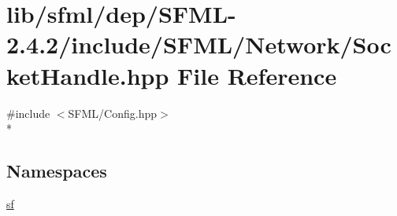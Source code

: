 \hypertarget{sfml_2dep_2_s_f_m_l-2_84_82_2include_2_s_f_m_l_2_network_2_socket_handle_8hpp}{\section{lib/sfml/dep/\-S\-F\-M\-L-\/2.4.2/include/\-S\-F\-M\-L/\-Network/\-Socket\-Handle.hpp File Reference}
\label{sfml_2dep_2_s_f_m_l-2_84_82_2include_2_s_f_m_l_2_network_2_socket_handle_8hpp}
}
{\ttfamily \#include $<$S\-F\-M\-L/\-Config.\-hpp$>$}\\*
\subsection*{Namespaces}
\begin{DoxyCompactItemize}
\item 
\hyperlink{namespacesf}{sf}
\end{DoxyCompactItemize}
